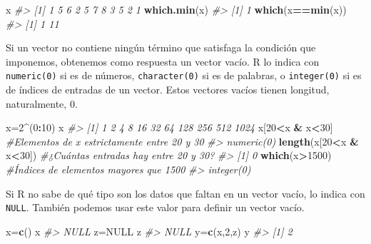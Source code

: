 \documentclass[
]{book}
\newenvironment{Shaded}{\begin{snugshade}}{\end{snugshade}}
\newcommand{\CommentTok}[1]{\textcolor[rgb]{0.56,0.35,0.01}{\textit{#1}}}
\newcommand{\DecValTok}[1]{\textcolor[rgb]{0.00,0.00,0.81}{#1}}
\newcommand{\KeywordTok}[1]{\textcolor[rgb]{0.13,0.29,0.53}{\textbf{#1}}}
\newcommand{\NormalTok}[1]{#1}
\newcommand{\OperatorTok}[1]{\textcolor[rgb]{0.81,0.36,0.00}{\textbf{#1}}}
\newcommand{\OtherTok}[1]{\textcolor[rgb]{0.56,0.35,0.01}{#1}}
\newcommand{\StringTok}[1]{\textcolor[rgb]{0.31,0.60,0.02}{#1}}
\theoremstyle{definition}
\theoremstyle{definition}
\theoremstyle{definition}
\theoremstyle{remark}
\begin{document}
\begin{Shaded}
\begin{Highlighting}[]
\NormalTok{x}
\CommentTok{\#\textgreater{}  [1] 1 5 6 2 5 7 8 3 5 2 1}
\KeywordTok{which.min}\NormalTok{(x)}
\CommentTok{\#\textgreater{} [1] 1}
\KeywordTok{which}\NormalTok{(x}\OperatorTok{==}\KeywordTok{min}\NormalTok{(x))}
\CommentTok{\#\textgreater{} [1]  1 11}
\end{Highlighting}
\end{Shaded}

Si un vector no contiene ningún término que satisfaga la condición que imponemos, obtenemos como respuesta un vector vacío. R lo indica con \texttt{numeric(0)} si es de números, \texttt{character(0)} si es de palabras, o \texttt{integer(0)} si es de índices de entradas de un vector. Estos vectores vacíos tienen longitud, naturalmente, 0.

\begin{Shaded}
\begin{Highlighting}[]
\NormalTok{x=}\DecValTok{2}\OperatorTok{\^{}}\NormalTok{(}\DecValTok{0}\OperatorTok{:}\DecValTok{10}\NormalTok{)}
\NormalTok{x}
\CommentTok{\#\textgreater{}  [1]    1    2    4    8   16   32   64  128  256  512 1024}
\NormalTok{x[}\DecValTok{20}\OperatorTok{\textless{}}\NormalTok{x }\OperatorTok{\&}\StringTok{ }\NormalTok{x}\OperatorTok{\textless{}}\DecValTok{30}\NormalTok{] }\CommentTok{\#Elementos de x estrictamente entre 20 y 30}
\CommentTok{\#\textgreater{} numeric(0)}
\KeywordTok{length}\NormalTok{(x[}\DecValTok{20}\OperatorTok{\textless{}}\NormalTok{x }\OperatorTok{\&}\StringTok{ }\NormalTok{x}\OperatorTok{\textless{}}\DecValTok{30}\NormalTok{]) }\CommentTok{\#¿Cuántas entradas hay entre 20 y 30?}
\CommentTok{\#\textgreater{} [1] 0}
\KeywordTok{which}\NormalTok{(x}\OperatorTok{\textgreater{}}\DecValTok{1500}\NormalTok{) }\CommentTok{\#Índices de elementos mayores que 1500}
\CommentTok{\#\textgreater{} integer(0)}
\end{Highlighting}
\end{Shaded}

Si R no sabe de qué tipo son los datos que faltan en un vector vacío, lo indica con \texttt{NULL}. También podemos usar este valor para definir un vector vacío.

\begin{Shaded}
\begin{Highlighting}[]
\NormalTok{x=}\KeywordTok{c}\NormalTok{()}
\NormalTok{x}
\CommentTok{\#\textgreater{} NULL}
\NormalTok{z=}\OtherTok{NULL}
\NormalTok{z}
\CommentTok{\#\textgreater{} NULL}
\NormalTok{y=}\KeywordTok{c}\NormalTok{(x,}\DecValTok{2}\NormalTok{,z)}
\NormalTok{y}
\CommentTok{\#\textgreater{} [1] 2}
\end{Highlighting}
\end{Shaded}
\end{document}
